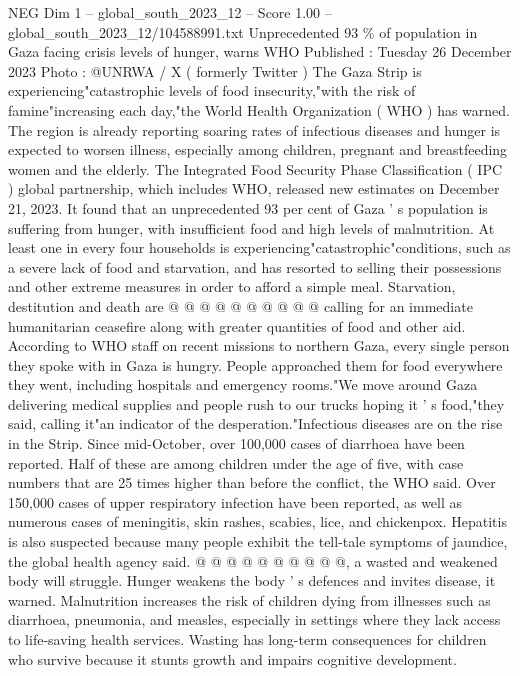 \begin{textsample}{NEG Dim 1 – global\_south\_2023\_12 – Score 1.00 – global\_south\_2023\_12/104588991.txt}  \label{ex:f1_neg_294}
Unprecedented 93 \% of population in Gaza facing crisis levels of hunger, warns WHO Published : Tuesday 26 December 2023 Photo : @UNRWA / X ( formerly Twitter ) The Gaza Strip is experiencing"catastrophic levels of food insecurity,"with the risk of famine"increasing each day,"the World Health Organization ( WHO ) has warned.
The region is already reporting soaring rates of infectious diseases and hunger is expected to worsen illness, especially among children, pregnant and breastfeeding women and the elderly.
The Integrated Food Security Phase Classification ( IPC ) global partnership, which includes WHO, released new estimates on December 21, 2023.
It found that an unprecedented 93 per cent of Gaza ' s population is suffering from hunger, with insufficient food and high levels of malnutrition.
At least one in every four households is experiencing"catastrophic"conditions, such as a severe lack of food and starvation, and has resorted to selling their possessions and other extreme measures in order to afford a simple meal.
Starvation, destitution and death are @ @ @ @ @ @ @ @ @ @ calling for an immediate humanitarian ceasefire along with greater quantities of food and other aid.
According to WHO staff on recent missions to northern Gaza, every single person they spoke with in Gaza is hungry.
People approached them for food everywhere they went, including hospitals and emergency rooms."We move around Gaza delivering medical supplies and people rush to our trucks hoping it ' s food,"they said, calling it"an indicator of the desperation."Infectious diseases are on the rise in the Strip.
Since mid-October, over 100,000 cases of diarrhoea have been reported.
Half of these are among children under the age of five, with case numbers that are 25 times higher than before the conflict, the WHO said.
Over 150,000 cases of upper respiratory infection have been reported, as well as numerous cases of meningitis, skin rashes, scabies, lice, and chickenpox.
Hepatitis is also suspected because many people exhibit the tell-tale symptoms of jaundice, the global health agency said. @ @ @ @ @ @ @ @ @ @, a wasted and weakened body will struggle.
Hunger weakens the body ' s defences and invites disease, it warned.
Malnutrition increases the risk of children dying from illnesses such as diarrhoea, pneumonia, and measles, especially in settings where they lack access to life-saving health services.
Wasting has long-term consequences for children who survive because it stunts growth and impairs cognitive development.

\end{textsample}
